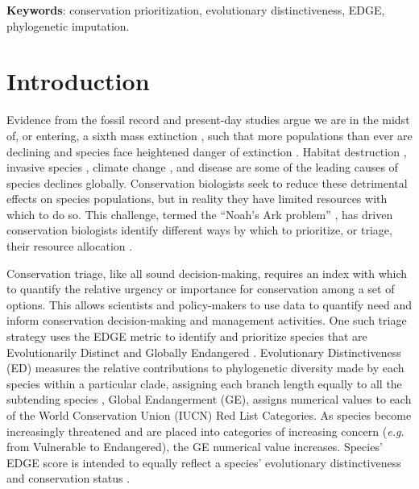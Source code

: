 \documentclass[12pt,english]{article}
\begin{document}
\textbf{Keywords}: conservation prioritization, evolutionary distinctiveness, 
EDGE, phylogenetic imputation.

\clearpage
\section*{Introduction}

Evidence from the fossil record and present-day studies argue we are in the
midst of, or entering, a sixth mass extinction \autocite{Barnosky2011,
Ceballos2015}, such that more populations than ever are declining and species
face heightened danger of extinction \autocite{Wake2008, Thomas2004}. Habitat
destruction \autocite{Brooks2002}, invasive species \autocite{Molnar2008},
climate change \autocite{Pounds2006}, and disease \autocite{Lips2006} are some
of the leading causes of species declines globally. Conservation biologists seek
to reduce these detrimental effects on species populations, but in reality they
have limited resources with which to do so. This challenge, termed the “Noah’s
Ark problem” \autocite{Weitzman1998}, has driven conservation biologists
identify different ways by which to prioritize, or triage, their resource
allocation \autocite{Bottrill2008}.

Conservation triage, like all sound decision-making, requires an index  with
which to quantify the relative urgency or importance for conservation among a
set of options. This allows scientists and policy-makers to use data to quantify
need and inform conservation decision-making and management activities. One such
triage strategy uses the EDGE metric to identify and prioritize species that are
Evolutionarily Distinct and Globally Endangered \autocite{Isaac2007}.
Evolutionary Distinctiveness (ED) measures the relative contributions to
phylogenetic diversity made by each species within a particular clade, assigning
each branch length equally to all the subtending species \autocite{Isaac2007},
Global Endangerment (GE), assigns numerical values to each of the World
Conservation Union (IUCN) Red List Categories. As species become increasingly
threatened and are placed into categories of increasing concern (\emph{e.g.}
from Vulnerable to Endangered), the GE numerical value increases. Species’ EDGE
score is intended to equally reflect a species’ evolutionary distinctiveness and
conservation status \autocite[even if it does not always in practice; see
][]{Pearse2015}.
\end{document}
